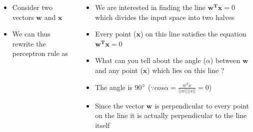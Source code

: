 \documentclass[serif, aspectratio=169]{beamer}
\begin{document}
\begin{frame}
\begin{columns}

\begin{overlayarea}{\textwidth}{\textheight}
\begin{itemize}\justifying
\item<1-> Consider two vectors $\mathbf{w}$ and $\mathbf{x}$ 
\item<4-> We can thus rewrite the perceptron rule as
\end{itemize}

\end{overlayarea}

\begin{overlayarea}{\textwidth}{\textheight}
\begin{itemize}\justifying
\item<6-> We are interested in finding the line $\mathbf{w^Tx} = 0$ which divides the input space into two halves
\item<7-> Every point ($\mathbf{x}$) on this line satisfies the equation $\mathbf{w^Tx} = 0$
\item<8-> What can you tell about the angle ($\alpha$) between $\mathbf{w}$ and any point ($\mathbf{x}$) which lies on this line ?
\item<9-> The angle is 90$\degree$ ($\because cos \alpha = \frac{w^Tx}{||w||||x||} = 0$)
\item<10-> Since the vector $\mathbf{w}$ is perpendicular to every point on the line it is actually perpendicular to the line itself
\end{itemize}
\end{overlayarea}
\end{columns}
\end{frame}
\end{document}

